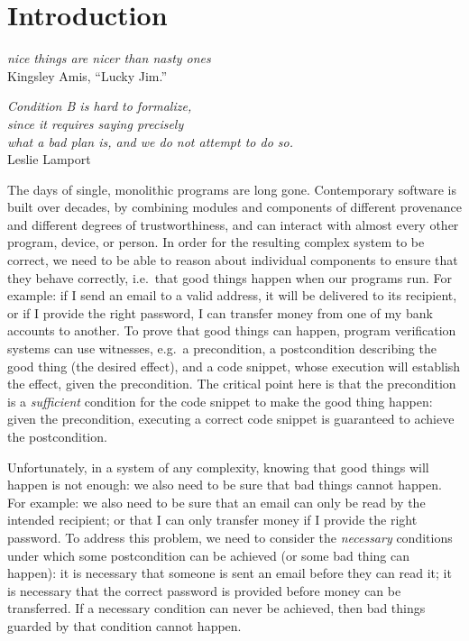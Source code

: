 \section{Introduction}

\begin{flushright}
  \textit{nice things are nicer than nasty ones}\\
  Kingsley Amis, ``Lucky Jim.''
\end{flushright}

\begin{flushright}
  \textit{Condition B is hard to formalize, \\since it requires saying precisely\\ what a bad
plan is, and we do not attempt to do so.}\\
  Leslie Lamport
\end{flushright}

The days of single, monolithic programs are long gone.  Contemporary
software is built over decades, by combining modules and components of
different provenance and different degrees of trustworthiness, and can
interact with almost every other program, device, or person.
In order for the resulting complex system to be correct, we need to be
able to reason about individual components to ensure that they behave
correctly, i.e.\ that good things happen when our programs run.
For example: if I send an email to a valid address, it will be
delivered to its recipient, or if I provide the right password, I can
transfer money from one of my bank accounts to another. 
To prove that good things can
happen, program verification systems can use witnesses, e.g.\ a
precondition, a postcondition describing the good thing (the desired
effect), and a code snippet, whose execution will establish the
effect, given the precondition.  The critical point here is that the
precondition is a \emph{sufficient} condition for the code snippet to
make the good thing happen: given the precondition, executing a
correct code snippet is guaranteed to achieve the postcondition.

Unfortunately, in a system of any complexity, knowing that good things
will happen is not enough: we also need to be sure that bad things
cannot happen. For example: we also need to be sure that an email can
only be read by the intended recipient; or that I can only transfer
money if I provide the right password. To address this problem,
we need to consider the \emph{necessary} conditions under which some
postcondition can be achieved (or some bad thing can happen):
it is necessary that someone is sent an email before they can read it;
it is necessary that the correct password is provided before money can
be transferred.  If a necessary condition can never be achieved, then
bad things guarded by that condition cannot happen.

